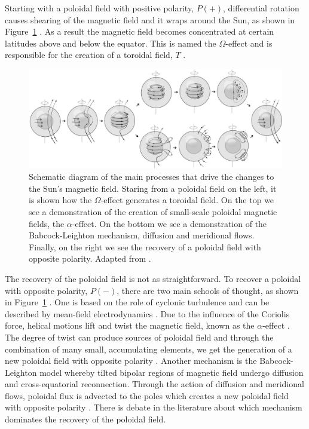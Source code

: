 Starting with a poloidal field with positive polarity, $P(+)$, differential rotation causes shearing of the magnetic field and it wraps around the Sun, as shown in Figure~\ref{fig:dynamo} \citep{sanchez_mean-field_2014}. As a result the magnetic field becomes concentrated at certain latitudes above and below the equator. This is named the $\Omega$-effect and is responsible for the creation of a toroidal field, $T$ \citep{hathaway_solar_2015, charbonneau_dynamo_2020}.

\begin{figure}[ht!]
	\centering
	\includegraphics[width=0.95\columnwidth]{sun_dynamo.jpg}
	\caption{Schematic diagram of the main processes that drive the changes to the Sun's magnetic field. Staring from a poloidal field on the left, it is shown how the $\Omega$-effect generates a toroidal field. On the top we see a demonstration of the creation of small-scale poloidal magnetic fields, the $\alpha$-effect. On the bottom we see a demonstration of the Babcock-Leighton mechanism, diffusion and meridional flows. Finally, on the right we see the recovery of a poloidal field with opposite polarity. Adapted from \citet{sanchez_mean-field_2014}.}
	\label{fig:dynamo}
\end{figure}

The recovery of the poloidal field is not as straightforward. To recover a poloidal with opposite polarity, $P(-)$, there are two main schools of thought, as shown in Figure~\ref{fig:dynamo} \citep{sanchez_mean-field_2014}. One is based on the role of cyclonic turbulence and can be described by mean-field electrodynamics \citep{charbonneau_dynamo_2020}. Due to the influence of the Coriolis force, helical motions lift and twist the magnetic field, known as the $\alpha$-effect \citep{charbonneau_dynamo_2020}. The degree of twist can produce sources of poloidal field and through the combination of many small, accumulating elements, we get the generation of a new poloidal field with opposite polarity \citep{charbonneau_dynamo_2020}. Another mechanism is the Babcock-Leighton model \citep{babcock_topology_1961, leighton_transport_1964} whereby tilted bipolar regions of magnetic field undergo diffusion and cross-equatorial reconnection. Through the action of diffusion and meridional flows, poloidal flux is advected to the poles which creates a new poloidal field with opposite polarity \citep{sheeley_surface_2005, charbonneau_dynamo_2020}. There is debate in the literature about which mechanism dominates the recovery of the poloidal field.


